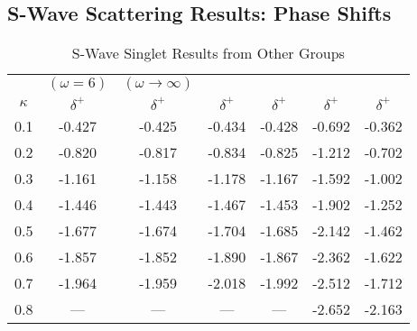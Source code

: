 \documentclass[Dissertation.tex]{subfiles}
\begin{document}
\subsection{S-Wave Scattering Results: Phase Shifts}

\begin{table}[H]
\begin{center}
\begin{tabular}{|c|c|c|c|c|c|c|}
\hline
 & $(\omega = 6)$ & $(\omega \rightarrow \infty)$ &  &  &  & \\
$\kappa$ & $\delta^+$ \cite{VanReeth2003} & $\delta^+$ \cite{VanReeth2003} & $\delta^+$ \cite{Blackwood2002} & $\delta^+$ \cite{Walters2004} & $\delta^+$ \cite{Ray1997} & $\delta^+$ \cite{Adhikari1999} \\
\hline
0.1 & -0.427 & -0.425 & -0.434 & -0.428 & -0.692 & -0.362 \\
0.2 & -0.820 & -0.817 & -0.834 & -0.825 & -1.212 & -0.702 \\
0.3 & -1.161 & -1.158 & -1.178 & -1.167 & -1.592 & -1.002 \\
0.4 & -1.446 & -1.443 & -1.467 & -1.453 & -1.902 & -1.252 \\
0.5 & -1.677 & -1.674 & -1.704 & -1.685 & -2.142 & -1.462 \\
0.6 & -1.857 & -1.852 & -1.890 & -1.867 & -2.362 & -1.622 \\
0.7 & -1.964 & -1.959 & -2.018 & -1.992 & -2.512 & -1.712 \\
0.8 &    --- &    --- &    --- &    --- & -2.652 & -2.163 \\
\hline
\end{tabular}
\caption{S-Wave Singlet Results from Other Groups}
\label{tab:SWaveSingletOther}
\end{center}
\end{table}
\end{document}
